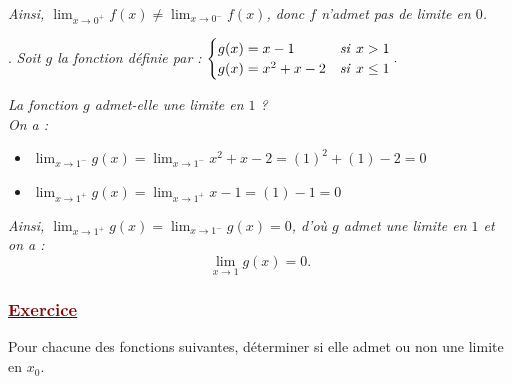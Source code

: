 \documentclass[12pt,a4paper]{article}
\begin{document}
\noindent \textit{Ainsi, $\displaystyle \lim_{x \to 0^+} f(x) \neq \lim_{x \to 0^-} f(x)$, donc $f$ n'admet pas de limite en $0$.}

\vspace{0.6cm}

. \textit{Soit $g$ la fonction définie par : } 
$\begin{cases} g(x) = x - 1 & \text{\textit{si }} x > 1 \\ g(x) = x^2 + x - 2 & \text{\textit{si }} x \leq 1 \end{cases}.$

\vspace{0.1cm}

\noindent \textit{La fonction $g$ admet-elle une limite en $1$ ?} \\
\textit{On a :}

\begin{itemize}
    \item $\displaystyle \lim_{x \to 1^-} g(x) = \lim_{x \to 1^-} x^2 + x - 2 = (1)^2 + (1) - 2 = 0$
    \vspace{0.2cm}
    \item $\displaystyle \lim_{x \to 1^+} g(x) = \lim_{x \to 1^+} x - 1 = (1) - 1 = 0$
\end{itemize}

\noindent \textit{Ainsi, $\displaystyle \lim_{x \to 1^+} g(x) = \lim_{x \to 1^-} g(x) = 0$, d'où $g$ admet une limite en $1$ et on a :}
\[
\lim_{x \to 1} g(x) = 0.
\]

\subsubsection*{\underline{\textcolor{darkred}{ Exercice }}}

Pour chacune des fonctions suivantes, déterminer si elle admet ou non une limite en $x_0$.

\vspace{0.4cm}
\end{document}
